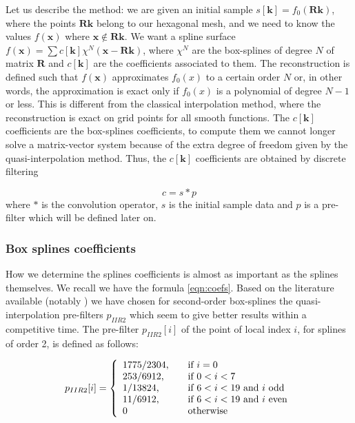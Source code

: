 \documentclass[proc]{edpsmath}
\begin{document}
Let us describe the method: we are given an initial sample $s[\mathbf{k}] = f_0(\mathbf{R} \mathbf{k})$, where the points $\mathbf{R} \mathbf{k}$ belong to our hexagonal mesh, and we need to know the values $f(\mathbf{x})$ where $\mathbf{x} \notin \mathbf{R} \mathbf{k}$. We want a spline surface $f(\mathbf{x}) = \sum c[\mathbf{k}] \chi^N(\mathbf{x} - \mathbf{R}\mathbf{k})$, where $\chi^N$ are the box-splines of degree $N$ of matrix $\mathbf{R}$ and $c[\mathbf{k}]$ are the coefficients associated to them. The reconstruction is defined such that $f(\mathbf{x})$ approximates $f_0(x)$ to a certain order $N$ or, in other words, the approximation is exact only if $f_0(x)$ is a polynomial of degree $N-1$ or less. This is different from the classical interpolation method, where the reconstruction is exact on grid points for all smooth functions. The $c[\mathbf{k}]$ coefficients are the box-splines coefficients, to compute them we cannot longer solve a matrix-vector system because of the extra degree of freedom given by the quasi-interpolation method. Thus, the  $c[\mathbf{k}]$ coefficients are obtained by discrete filtering\cite{Condat2006a}

\begin{equation}
\label{eqn:coefs}
 c = s * p
\end{equation}
where $*$ is the convolution operator, $s$ is the initial sample data and $p$ is a pre-filter which will be defined later on.


\subsubsection{Box splines coefficients}

How we determine the splines coefficients is almost as important as the splines themselves. We recall we have the formula \eqref{eqn:coefs}. Based on the literature available (notably \cite{Condat2007}) we have chosen for second-order box-splines the quasi-interpolation pre-filters $p_{IIR2}$ which seem to give better results within a competitive time. The pre-filter $p_{IIR2}[i]$ of the point of local index $i$, for splines of order 2, is defined as follows: 


\begin{equation}
\label{eqn:filterIIR2}
p_{IIR2} [i] = \left\{
  \begin{array}{l l}
    1775/2304\text{,} & \quad \text{if } i = 0\\
    253/6912\text{,} & \quad \text{if } 0<i<7\\
    1/13824\text{,} & \quad \text{if } 6<i<19 \text{ and $i$ odd}\\
    11/6912\text{,} & \quad \text{if } 6<i<19 \text{ and $i$ even}\\
    0 & \quad \text{otherwise}
  \end{array} \right.
\end{equation}
\end{document}
